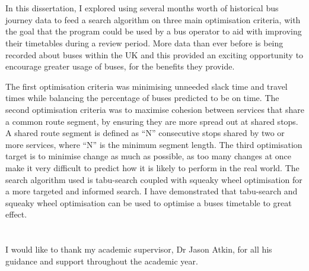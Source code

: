 \documentclass{article}
\begin{document}
\setlength{\parskip}{1em}



\section*{}

In this dissertation, I explored using several months worth of historical bus journey data to feed a search algorithm on three main optimisation criteria, with the goal that the program could be used by a bus operator to aid with improving their timetables during a review period. More data than ever before is being recorded about buses within the UK and this provided an exciting opportunity to encourage greater usage of buses, for the benefits they provide. 

\par
The first optimisation criteria was minimising unneeded slack time and travel times while balancing the percentage of buses predicted to be on time. The second optimisation criteria was to maximise cohesion between services that share a common route segment, by ensuring they are more spread out at shared stops. A shared route segment is defined as ``N'' consecutive stops shared by two or more services, where ``N'' is the minimum segment length. The third optimisation target is to minimise change as much as possible, as too many changes at once make it very difficult to predict how it is likely to perform in the real world. The search algorithm used is tabu-search coupled with squeaky wheel optimisation for a more targeted and informed search. I have demonstrated that tabu-search and squeaky wheel optimisation can be used to optimise a buses timetable to great effect. 


	
\vspace{5em}


\section*{}

I would like to thank my academic supervisor, Dr Jason Atkin, for all his guidance and support throughout the academic year.

\setlength{\parskip}{0em}


\newpage

\tableofcontents
\end{document}
